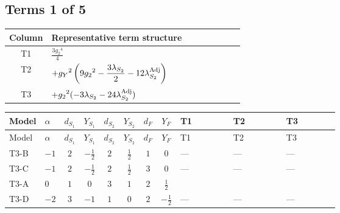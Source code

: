 \documentclass[8pt]{article}
\begin{document}
\begin{landscape}
\subsection*{Terms 1 of 5}
\begin{center}
\begin{tabular}{@{}c >{\raggedright\arraybackslash}p{0.82\linewidth}@{}}
\toprule
Column & Representative term structure \\
\midrule
T1 & \(\displaystyle \frac{3 {g_2}^4}{4}\) \\
\midrule
T2 & \(\displaystyle +{g_Y}^2 \left(9 {g_2}^2-\frac{3 {\lambda_{S_2}}}{2}-12 {\lambda_{S_2}^{\rm Adj}}\right)\) \\
\midrule
T3 & \(\displaystyle +{g_2}^2 (-3 {\lambda_{S_2}}-24 {\lambda_{S_2}^{\rm Adj}})\) \\
\midrule
\bottomrule
\end{tabular}
\end{center}
\smallskip
\tiny
\begin{longtable}{@{}llcccccc >{\raggedright\arraybackslash}p{0.21\linewidth} >{\raggedright\arraybackslash}p{0.21\linewidth} >{\raggedright\arraybackslash}p{0.21\linewidth}@{}}
\toprule
Model & $\alpha$ & $d_{S_1}$ & $Y_{S_1}$ & $d_{S_2}$ & $Y_{S_2}$ & $d_F$ & $Y_F$ & T1 & T2 & T3 \\
\midrule
\endfirsthead
\toprule
Model & $\alpha$ & $d_{S_1}$ & $Y_{S_1}$ & $d_{S_2}$ & $Y_{S_2}$ & $d_F$ & $Y_F$ & T1 & T2 & T3 \\
\midrule
\endhead
T3-B & $-1$ & $2$ & $-\frac{1}{2}$ & $2$ & $\frac{1}{2}$ & $1$ & $0$ & --- & --- & --- \\
\midrule
T3-C & $-1$ & $2$ & $-\frac{1}{2}$ & $2$ & $\frac{1}{2}$ & $3$ & $0$ & --- & --- & --- \\
\midrule
T3-A & $0$ & $1$ & $0$ & $3$ & $1$ & $2$ & $\frac{1}{2}$ & \scriptsize\adjustbox{max width=\linewidth}{$\begin{gathered} \frac{3 {g_2}^4}{4}\end{gathered}$} & \scriptsize\adjustbox{max width=\linewidth}{$\begin{gathered} +{g_Y}^2 \left(9 {g_2}^2-\frac{3 {\lambda_{S_2}}}{2}-12 {\lambda_{S_2}^{\rm Adj}}\right)\end{gathered}$} & \scriptsize\adjustbox{max width=\linewidth}{$\begin{gathered} +{g_2}^2 (-3 {\lambda_{S_2}}-24 {\lambda_{S_2}^{\rm Adj}})\end{gathered}$} \\
\midrule
T3-D & $-2$ & $3$ & $-1$ & $1$ & $0$ & $2$ & $-\frac{1}{2}$ & --- & --- & --- \\

\end{longtable}
\end{landscape}
\end{document}
